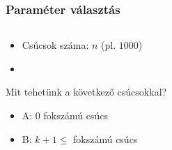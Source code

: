 \begin{frame}
\frametitle{Paraméter választás}

\begin{columns}
\begin{column}{0.5\textwidth}
\begin{footnotesize}
\begin{itemize}
\item Csúcsok száma: $n$ (pl. $1000$)
\item
{}
\end{itemize}
\emptyline
Mit tehetünk a következő csúcsokkal?
\begin{itemize}
\item A: $0$ fokszámú csúcs\\
\item B: $k+1\leq$ fokszámú csúcs\\
\\
\end{itemize}
\end{footnotesize}
\end{column}


\end{columns}
\end{frame}
